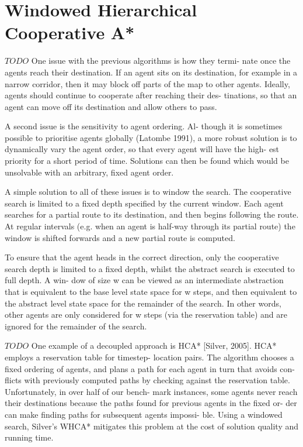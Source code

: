 \section{Windowed Hierarchical Cooperative A*}
$TODO$
One issue with the previous algorithms is how they termi-
nate once the agents reach their destination. If an agent sits
on its destination, for example in a narrow corridor, then
it may block off parts of the map to other agents. Ideally,
agents should continue to cooperate after reaching their des-
tinations, so that an agent can move off its destination and
allow others to pass.

A second issue is the sensitivity to agent ordering. Al-
though it is sometimes possible to prioritise agents globally
(Latombe 1991), a more robust solution is to dynamically
vary the agent order, so that every agent will have the high-
est priority for a short period of time. Solutions can then
be found which would be unsolvable with an arbitrary, fixed
agent order.

A simple solution to all of these issues is to window the
search. The cooperative search is limited to a fixed depth
specified by the current window. Each agent searches for a
partial route to its destination, and then begins following the
route. At regular intervals (e.g. when an agent is half-way
through its partial route) the window is shifted forwards and
a new partial route is computed.

To ensure that the agent heads in the correct direction,
only the cooperative search depth is limited to a fixed depth,
whilst the abstract search is executed to full depth. A win-
dow of size w can be viewed as an intermediate abstraction
that is equivalent to the base level state space for w steps,
and then equivalent to the abstract level state space for the
remainder of the search. In other words, other agents are
only considered for w steps (via the reservation table) and
are ignored for the remainder of the search.
\cite{cooppath}


$TODO$
One example of a decoupled approach is HCA* [Silver,
2005]. HCA* employs a reservation table for timestep-
location pairs. The algorithm chooses a fixed ordering of
agents, and plans a path for each agent in turn that avoids con-
flicts with previously computed paths by checking against the
reservation table. Unfortunately, in over half of our bench-
mark instances, some agents never reach their destinations
because the paths found for previous agents in the fixed or-
der can make finding paths for subsequent agents impossi-
ble. Using a windowed search, Silver’s WHCA* mitigates
this problem at the cost of solution quality and running time.
\cite{completealgo_standley}

